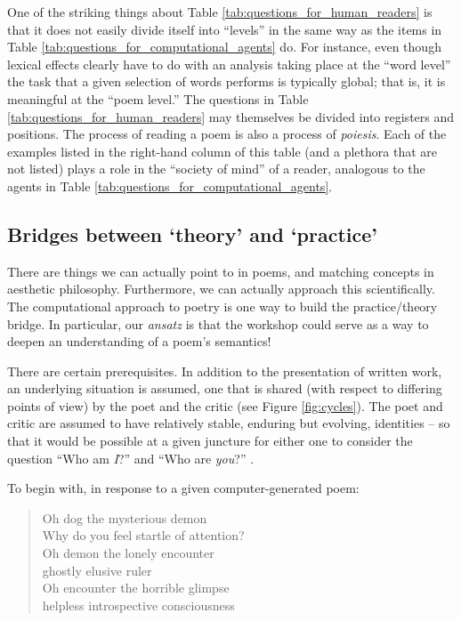 One of the striking things about Table
\ref{tab:questions_for_human_readers} is that it does not easily
divide itself into ``levels'' in the same way as the items in Table
\ref{tab:questions_for_computational_agents} do.  For instance, even
though lexical effects clearly have to do with an analysis taking
place at the ``word level'' the task that a given selection of words
performs is typically global; that is, it is meaningful at the ``poem
level.''  The questions in Table \ref{tab:questions_for_human_readers}
may themselves be divided into registers and positions.  The process
of reading a poem is also a process of \emph{poiesis}.  Each of the
examples listed in the right-hand column of this table (and a plethora
that are not listed) plays a role in the ``society of mind'' of a
reader, analogous to the agents in Table
\ref{tab:questions_for_computational_agents}.

\subsection{Bridges between `theory' and `practice'}

There are things we can actually point to in poems, and matching
concepts in aesthetic philosophy.  Furthermore, we can actually
approach this scientifically.  The computational approach to poetry is
one way to build the practice/theory bridge.  In particular, our
\emph{ansatz} is that the workshop could serve as a way to deepen an
understanding of a poem's semantics!

There are certain prerequisites.  In addition to the presentation of
written work, an underlying situation is assumed, one that is shared
(with respect to differing points of view) by the poet and the critic
(see Figure \ref{fig:cycles}).  The poet and critic are assumed to
have relatively stable, enduring but evolving, identities -- so that
it would be possible at a given juncture for either one to consider
the question ``Who am \emph{I}?''  and ``Who are \emph{you}?''
\cite[p. 251]{bakhtin1984problems}.

To begin with, in response to a given computer-generated poem:

{\itshape
\begin{verse}
%
Oh dog the mysterious demon\\
Why do you feel startle of attention?\\
Oh demon the lonely encounter\\
ghostly elusive ruler\\
Oh encounter the horrible glimpse\\
helpless introspective consciousness\\
\end{verse}
}

